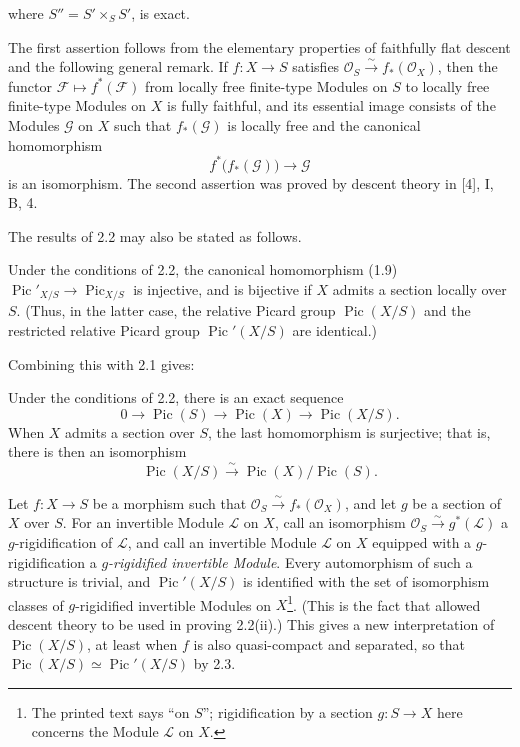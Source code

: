 where $S''=S'\times_SS'$, is exact.

The first assertion follows from the elementary properties of faithfully flat
descent and the following general remark. If $f:X\longrightarrow S$ satisfies
$\mathcal O_S\xrightarrow{\sim}f_*(\mathcal O_X)$, then the functor
$\mathcal F\longmapsto f^*(\mathcal F)$ from locally free finite-type Modules
on $S$ to locally free finite-type Modules on $X$ is fully faithful, and its
essential image consists of the Modules $\mathcal G$ on $X$ such that
$f_*(\mathcal G)$ is locally free and the canonical homomorphism
\[
f^*\bigl(f_*(\mathcal G)\bigr)\longrightarrow\mathcal G
\]
is an isomorphism. The second assertion was proved by descent theory in [4],
I, B, 4.

The results of 2.2 may also be stated as follows.

 Under the conditions of 2.2, the canonical homomorphism
(1.9) $\operatorname{Pic}'_{X/S}\longrightarrow\operatorname{Pic}_{X/S}$ is
injective, and is bijective if $X$ admits a section locally over $S$. (Thus, in
the latter case, the relative Picard group $\operatorname{Pic}(X/S)$ and the
restricted relative Picard group $\operatorname{Pic}'(X/S)$ are identical.)

Combining this with 2.1 gives:

 Under the conditions of 2.2, there is an exact sequence
\[
0\longrightarrow\operatorname{Pic}(S)\longrightarrow\operatorname{Pic}(X)
\longrightarrow\operatorname{Pic}(X/S).
\]
When $X$ admits a section over $S$, the last homomorphism is surjective; that
is, there is then an isomorphism
\[
\operatorname{Pic}(X/S)\xrightarrow{\sim}
\operatorname{Pic}(X)/\operatorname{Pic}(S).
\]

 Let $f:X\longrightarrow S$ be a morphism such that
$\mathcal O_S\xrightarrow{\sim}f_*(\mathcal O_X)$, and let $g$ be a section of
$X$ over $S$. For an invertible Module $\mathcal L$ on $X$, call an isomorphism
$\mathcal O_S\xrightarrow{\sim}g^*(\mathcal L)$ a $g$-rigidification of
$\mathcal L$, and call an invertible Module $\mathcal L$ on $X$ equipped with a
$g$-rigidification a \emph{$g$-rigidified invertible Module}. Every
automorphism of such a structure is trivial, and $\operatorname{Pic}'(X/S)$ is
identified with the set of isomorphism classes of $g$-rigidified invertible
Modules on $X$\footnote{The printed text says “on $S$”; rigidification by a
section $g:S\to X$ here concerns the Module $\mathcal L$ on $X$.}. (This is the
fact that allowed descent theory to be used in proving 2.2(ii).) This gives a
new interpretation of $\operatorname{Pic}(X/S)$, at least when $f$ is also
quasi-compact and separated, so that
$\operatorname{Pic}(X/S)\simeq\operatorname{Pic}'(X/S)$ by 2.3.

